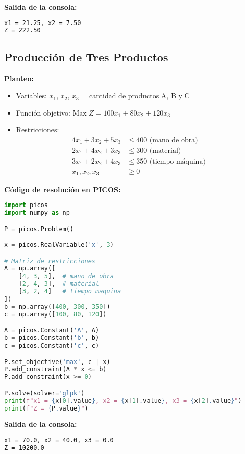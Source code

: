 \documentclass[12pt]{article}
\begin{document}
\textbf{Salida de la consola:}
\begin{lstlisting}[language=bash,backgroundcolor=\color{black},basicstyle=\color{white}\ttfamily,numbers=none]
x1 = 21.25, x2 = 7.50
Z = 222.50
\end{lstlisting}

\subsection{Producción de Tres Productos}

\textbf{Planteo:}
\begin{itemize}
\item Variables: $x_1$, $x_2$, $x_3$ = cantidad de productos A, B y C
\item Función objetivo: Max $Z = 100x_1 + 80x_2 + 120x_3$
\item Restricciones:
  \begin{align*}
  4x_1 + 3x_2 + 5x_3 &\leq 400 \text{ (mano de obra)} \\
  2x_1 + 4x_2 + 3x_3 &\leq 300 \text{ (material)} \\
  3x_1 + 2x_2 + 4x_3 &\leq 350 \text{ (tiempo máquina)} \\
  x_1, x_2, x_3 &\geq 0
  \end{align*}
\end{itemize}

\textbf{Código de resolución en PICOS:}
\begin{lstlisting}[language=Python]
import picos
import numpy as np

P = picos.Problem()

x = picos.RealVariable('x', 3)

# Matriz de restricciones
A = np.array([
    [4, 3, 5],  # mano de obra
    [2, 4, 3],  # material
    [3, 2, 4]   # tiempo maquina
])
b = np.array([400, 300, 350])
c = np.array([100, 80, 120])

A = picos.Constant('A', A)
b = picos.Constant('b', b)
c = picos.Constant('c', c)

P.set_objective('max', c | x)
P.add_constraint(A * x <= b)
P.add_constraint(x >= 0)

P.solve(solver='glpk')
print(f"x1 = {x[0].value}, x2 = {x[1].value}, x3 = {x[2].value}")
print(f"Z = {P.value}")
\end{lstlisting}

\textbf{Salida de la consola:}
\begin{lstlisting}[language=bash,backgroundcolor=\color{black},basicstyle=\color{white}\ttfamily,numbers=none]
x1 = 70.0, x2 = 40.0, x3 = 0.0
Z = 10200.0
\end{lstlisting}
\end{document}
